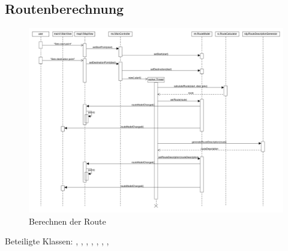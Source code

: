 \documentclass[a4paper, 11pt]{article}
\begin{document}
\subsection{Routenberechnung} %
\begin{figure}[H]
\centering
\includegraphics[angle=90, height=\textheight]{RouteCalculationSequenz}
\caption{Berechnen der Route}
\label{fig:sequenz_routeCalculation}
\end{figure}
Beteiligte Klassen: , , , , , , , 
\end{document}
